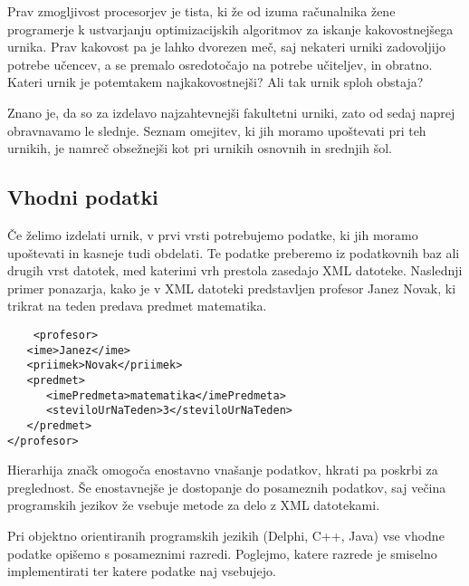 \documentclass[a4paper,10pt]{article}
\begin{document}
Prav zmogljivost procesorjev je tista, ki že od izuma računalnika žene programerje k
ustvarjanju optimizacijskih algoritmov za iskanje kakovostnejšega urnika. Prav kakovost
pa je lahko dvorezen meč, saj nekateri urniki zadovoljijo potrebe učencev, a se premalo
osredotočajo na potrebe učiteljev, in obratno. Kateri urnik je potemtakem najkakovostnejši?
Ali tak urnik sploh obstaja?

Znano je, da so za izdelavo najzahtevnejši fakultetni urniki, zato od sedaj naprej
obravnavamo le slednje. Seznam omejitev, ki jih moramo upoštevati pri teh urnikih,
je namreč obsežnejši kot pri urnikih osnovnih in srednjih šol.

\subsection{Vhodni podatki}

Če želimo izdelati urnik, v prvi vrsti potrebujemo podatke, ki jih moramo upoštevati in
kasneje tudi obdelati. Te podatke preberemo iz podatkovnih baz ali drugih vrst datotek,
med katerimi vrh prestola zasedajo XML datoteke. Naslednji primer ponazarja, kako je v
XML datoteki predstavljen profesor Janez Novak, ki trikrat na teden predava predmet
matematika.


\begin{verbatim}
	<profesor>
   <ime>Janez</ime>
   <priimek>Novak</priimek>
   <predmet>
      <imePredmeta>matematika</imePredmeta>
      <steviloUrNaTeden>3</steviloUrNaTeden>
   </predmet>
</profesor>
\end{verbatim}
%
Hierarhija značk omogoča enostavno vnašanje podatkov, hkrati pa poskrbi za preglednost.
Še enostavnejše je dostopanje do posameznih podatkov, saj večina programskih jezikov že
vsebuje metode za delo z XML datotekami.

Pri objektno orientiranih programskih jezikih (Delphi, C++, Java) vse vhodne podatke
opišemo s posameznimi razredi. Poglejmo, katere razrede je smiselno implementirati ter
katere podatke naj vsebujejo.
\end{document}
